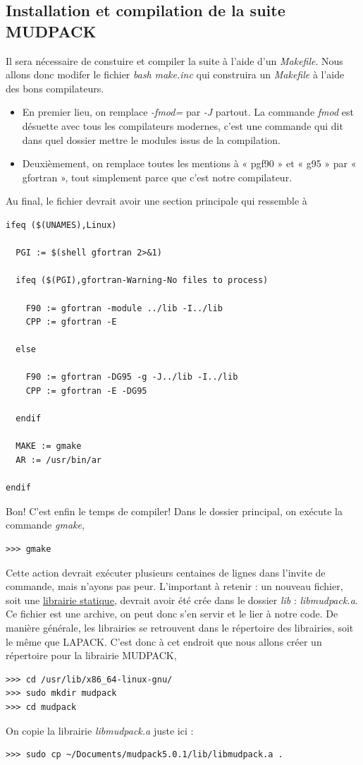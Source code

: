 \documentclass[10pt]{article}
\numberwithin{equation}{section}
\begin{document}
\subsection{Installation et compilation de la suite MUDPACK}
\label{sec:orgab25c45}
Il sera nécessaire de constuire et compiler la suite à l'aide d'un \emph{Makefile}.
Nous allons donc modifer le fichier \emph{bash} \emph{make.inc} qui construira un \emph{Makefile} à l'aide des bons compilateurs.
\begin{itemize}
\item En premier lieu, on remplace \emph{-fmod=} par \emph{-J} partout. La commande \emph{fmod} est désuette avec tous les compilateurs modernes, c'est une commande qui dit dans quel dossier mettre le modules issus de la compilation.
\item Deuxièmement, on remplace toutes les mentions  à « pgf90 » et « g95 » par « gfortran », tout simplement parce que c'est notre compilateur.
\end{itemize}

Au final, le fichier devrait avoir une section principale qui ressemble à

\begin{verbatim}
ifeq ($(UNAMES),Linux)

  PGI := $(shell gfortran 2>&1)

  ifeq ($(PGI),gfortran-Warning-No files to process)

    F90 := gfortran -module ../lib -I../lib
    CPP := gfortran -E

  else

    F90 := gfortran -DG95 -g -J../lib -I../lib 
    CPP := gfortran -E -DG95

  endif

  MAKE := gmake
  AR := /usr/bin/ar

endif
\end{verbatim}

Bon! C'est enfin le temps de compiler! Dans le dossier principal, on exécute la commande \emph{gmake},
\begin{verbatim}
>>> gmake
\end{verbatim}
Cette action devrait exécuter plusieurs centaines de lignes dans l'invite de commande, mais n'ayons pas peur.
L'important à retenir : un nouveau fichier, soit une \href{https://docs.oracle.com/cd/E19957-01/805-4940/6j4m1u7ov/index.html}{librairie statique}, devrait avoir été crée dans le dossier \emph{lib} : \emph{libmudpack.a}.
Ce fichier est une archive, on peut donc s'en servir et le lier à notre code.
De manière générale, les librairies se retrouvent dans le répertoire des librairies, soit le même que LAPACK.
C'est donc à cet endroit que nous allons créer un répertoire pour la librairie MUDPACK,
\begin{verbatim}
>>> cd /usr/lib/x86_64-linux-gnu/
>>> sudo mkdir mudpack
>>> cd mudpack
\end{verbatim}
On copie la librairie \emph{libmudpack.a} juste ici :
\begin{verbatim}
>>> sudo cp ~/Documents/mudpack5.0.1/lib/libmudpack.a .
\end{verbatim}
\end{document}
